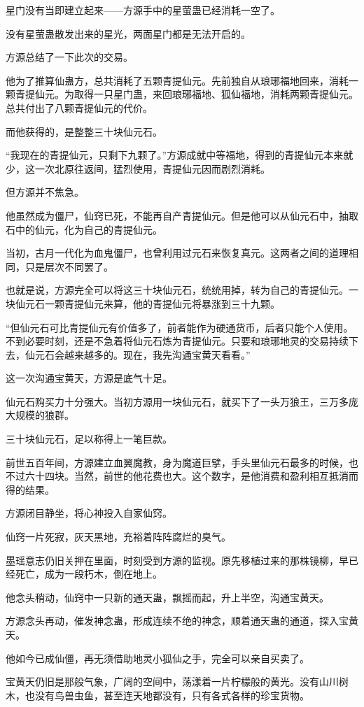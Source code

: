 \begin{this_body}
星门没有当即建立起来——方源手中的星萤蛊已经消耗一空了。

没有星萤蛊散发出来的星光，两面星门都是无法开启的。

方源总结了一下此次的交易。

他为了推算仙蛊方，总共消耗了五颗青提仙元。先前独自从琅琊福地回来，消耗一颗青提仙元。为取得一只星门蛊，来回琅琊福地、狐仙福地，消耗两颗青提仙元。总共付出了八颗青提仙元的代价。

而他获得的，是整整三十块仙元石。

“我现在的青提仙元，只剩下九颗了。”方源成就中等福地，得到的青提仙元本来就少，这一次北原往返间，猛烈使用，青提仙元因而剧烈消耗。

但方源并不焦急。

他虽然成为僵尸，仙窍已死，不能再自产青提仙元。但是他可以从仙元石中，抽取石中的仙元，化为自己的青提仙元。

当初，古月一代化为血鬼僵尸，也曾利用过元石来恢复真元。这两者之间的道理相同，只是层次不同罢了。

也就是说，方源完全可以将这三十块仙元石，统统用掉，转为自己的青提仙元。一块仙元石一颗青提仙元来算，他的青提仙元将暴涨到三十九颗。

“但仙元石可比青提仙元有价值多了，前者能作为硬通货币，后者只能个人使用。不到必要时刻，还是不急着将仙元石炼为青提仙元。只要和琅琊地灵的交易持续下去，仙元石会越来越多的。现在，我先沟通宝黄天看看。”

这一次沟通宝黄天，方源是底气十足。

仙元石购买力十分强大。当初方源用一块仙元石，就买下了一头万狼王，三万多庞大规模的狼群。

三十块仙元石，足以称得上一笔巨款。

前世五百年间，方源建立血翼魔教，身为魔道巨擘，手头里仙元石最多的时候，也不过六十四块。当然，前世的他花费也大。这个数字，是他消费和盈利相互抵消而得的结果。

方源闭目静坐，将心神投入自家仙窍。

仙窍一片死寂，灰天黑地，充裕着阵阵腐烂的臭气。

墨瑶意志仍旧关押在里面，时刻受到方源的监视。原先移植过来的那株镜柳，早已经死亡，成为一段朽木，倒在地上。

他念头稍动，仙窍中一只新的通天蛊，飘摇而起，升上半空，沟通宝黄天。

方源念头再动，催发神念蛊，形成连续不绝的神念，顺着通天蛊的通道，探入宝黄天。

他如今已成仙僵，再无须借助地灵小狐仙之手，完全可以亲自买卖了。

宝黄天仍旧是那般气象，广阔的空间中，荡漾着一片柠檬般的黄光。没有山川树木，也没有鸟兽虫鱼，甚至连天地都没有，只有各式各样的珍宝货物。


\end{this_body}
